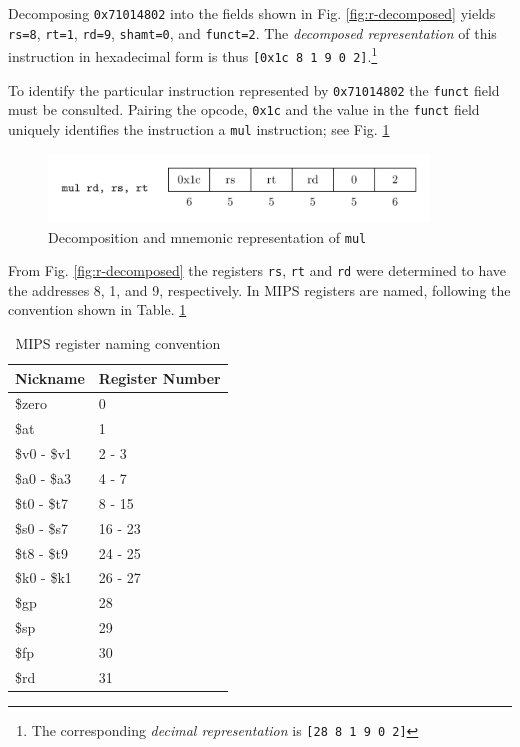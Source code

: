 Decomposing \texttt{0x71014802} into the fields shown in
Fig. \ref{fig:r-decomposed} yields \texttt{rs=8}, \texttt{rt=1},
\texttt{rd=9}, \texttt{shamt=0}, and \texttt{funct=2}. The
\emph{decomposed representation} of this instruction in hexadecimal
form is thus \texttt{[0x1c 8 1 9 0 2]}.\footnote{The corresponding
\emph{decimal representation} is \texttt{[28 8 1 9 0 2]}}

To identify the particular instruction represented by
\texttt{0x71014802} the \texttt{funct} field must be
consulted. Pairing the opcode, \texttt{0x1c} and the value in the
\texttt{funct} field uniquely identifies the instruction a
\texttt{mul} instruction; see Fig. \ref{fig:mul-decomposed}

\begin{figure}[H]
  \centering
  \includegraphics[width=0.9\textwidth]{figures/mul-decomposed.png}
  \caption{Decomposition and mnemonic representation of \texttt{mul}}
  \label{fig:mul-decomposed}
\end{figure}

From Fig. \ref{fig:r-decomposed} the registers \texttt{rs},
\texttt{rt} and \texttt{rd} were determined to have the addresses 8,
1, and 9, respectively. In MIPS registers are named, following the
convention shown in Table. \ref{table:mips-register-naming-convention}

\begin{table}[H]
\centering
\caption{MIPS register naming convention}
\begin{tabular}{ll}
\toprule
Nickname & Register Number \\
\midrule
\$zero      & 0            \\
\$at        & 1            \\
\$v0 - \$v1 & 2 - 3        \\
\$a0 - \$a3 & 4 - 7        \\
\$t0 - \$t7 & 8 - 15       \\
\$s0 - \$s7 & 16 - 23      \\
\$t8 - \$t9 & 24 - 25      \\
\$k0 - \$k1 & 26 - 27      \\
\$gp        & 28           \\
\$sp        & 29           \\
\$fp        & 30           \\
\$rd        & 31           \\
\bottomrule
\end{tabular}
\label{table:mips-register-naming-convention}
\end{table}

